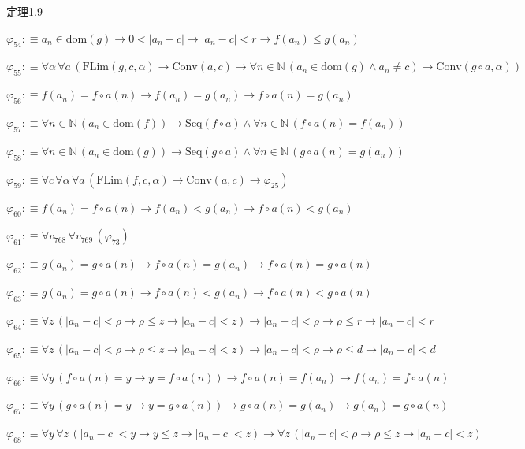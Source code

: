 \begin{fullproof}{定理1.9}
\begin{abbrevlist}
\item $\varphi_{54} :\equiv a_{n} \in \mathrm{dom}(g) \to 0 < \lvert a_{n} - c \rvert \to \lvert a_{n} - c \rvert < r \to f(a_{n}) \leq g(a_{n})$
\item $\varphi_{55} :\equiv \forall \alpha\,\forall a\,(\mathrm{FLim}(g,c,\alpha) \to \mathrm{Conv}(a,c) \to \forall n \in \mathbb{N}\,(a_{n} \in \mathrm{dom}(g) \land a_{n} \neq c) \to \mathrm{Conv}(g \circ a,\alpha))$
\item $\varphi_{56} :\equiv f(a_{n}) = f \circ a(n) \to f(a_{n}) = g(a_{n}) \to f \circ a(n) = g(a_{n})$
\item $\varphi_{57} :\equiv \forall n \in \mathbb{N}\,(a_{n} \in \mathrm{dom}(f)) \to \mathrm{Seq}(f \circ a) \land \forall n \in \mathbb{N}\,(f \circ a(n) = f(a_{n}))$
\item $\varphi_{58} :\equiv \forall n \in \mathbb{N}\,(a_{n} \in \mathrm{dom}(g)) \to \mathrm{Seq}(g \circ a) \land \forall n \in \mathbb{N}\,(g \circ a(n) = g(a_{n}))$
\item $\varphi_{59} :\equiv \forall c\,\forall \alpha\,\forall a\,(\mathrm{FLim}(f,c,\alpha) \to \mathrm{Conv}(a,c) \to \varphi_{25})$
\item $\varphi_{60} :\equiv f(a_{n}) = f \circ a(n) \to f(a_{n}) < g(a_{n}) \to f \circ a(n) < g(a_{n})$
\item $\varphi_{61} :\equiv \forall v_{768}\,\forall v_{769}\,(\varphi_{73})$
\item $\varphi_{62} :\equiv g(a_{n}) = g \circ a(n) \to f \circ a(n) = g(a_{n}) \to f \circ a(n) = g \circ a(n)$
\item $\varphi_{63} :\equiv g(a_{n}) = g \circ a(n) \to f \circ a(n) < g(a_{n}) \to f \circ a(n) < g \circ a(n)$
\item $\varphi_{64} :\equiv \forall z\,(\lvert a_{n} - c \rvert < \rho \to \rho \leq z \to \lvert a_{n} - c \rvert < z) \to \lvert a_{n} - c \rvert < \rho \to \rho \leq r \to \lvert a_{n} - c \rvert < r$
\item $\varphi_{65} :\equiv \forall z\,(\lvert a_{n} - c \rvert < \rho \to \rho \leq z \to \lvert a_{n} - c \rvert < z) \to \lvert a_{n} - c \rvert < \rho \to \rho \leq d \to \lvert a_{n} - c \rvert < d$
\item $\varphi_{66} :\equiv \forall y\,(f \circ a(n) = y \to y = f \circ a(n)) \to f \circ a(n) = f(a_{n}) \to f(a_{n}) = f \circ a(n)$
\item $\varphi_{67} :\equiv \forall y\,(g \circ a(n) = y \to y = g \circ a(n)) \to g \circ a(n) = g(a_{n}) \to g(a_{n}) = g \circ a(n)$
\item $\varphi_{68} :\equiv \forall y\,\forall z\,(\lvert a_{n} - c \rvert < y \to y \leq z \to \lvert a_{n} - c \rvert < z) \to \forall z\,(\lvert a_{n} - c \rvert < \rho \to \rho \leq z \to \lvert a_{n} - c \rvert < z)$

\end{abbrevlist}
\end{fullproof}
